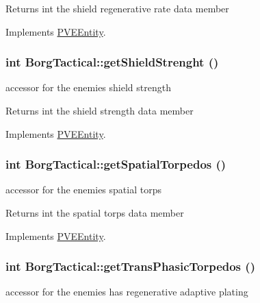 \begin{DoxyReturn}{Returns}
int the shield regenerative rate data member 
\end{DoxyReturn}


Implements \hyperlink{classPVEEntity}{PVEEntity}.

\hypertarget{classBorgTactical_add906680b27f10814a90871df6b7a5bf}{
\subsubsection[{getShieldStrenght}]{\setlength{\rightskip}{0pt plus 5cm}int BorgTactical::getShieldStrenght ()}}
\label{d0/d4e/classBorgTactical_add906680b27f10814a90871df6b7a5bf}
accessor for the enemies shield strength

\begin{DoxyReturn}{Returns}
int the shield strength data member 
\end{DoxyReturn}


Implements \hyperlink{classPVEEntity}{PVEEntity}.

\hypertarget{classBorgTactical_a2809be98aae522a10adffabe2a118001}{
\subsubsection[{getSpatialTorpedos}]{\setlength{\rightskip}{0pt plus 5cm}int BorgTactical::getSpatialTorpedos ()}}
\label{d0/d4e/classBorgTactical_a2809be98aae522a10adffabe2a118001}
accessor for the enemies spatial torps

\begin{DoxyReturn}{Returns}
int the spatial torps data member 
\end{DoxyReturn}


Implements \hyperlink{classPVEEntity}{PVEEntity}.

\hypertarget{classBorgTactical_aa1b3f168acdd21317a4722a29f141bbd}{
\subsubsection[{getTransPhasicTorpedos}]{\setlength{\rightskip}{0pt plus 5cm}int BorgTactical::getTransPhasicTorpedos ()}}
\label{d0/d4e/classBorgTactical_aa1b3f168acdd21317a4722a29f141bbd}
accessor for the enemies has regenerative adaptive plating

